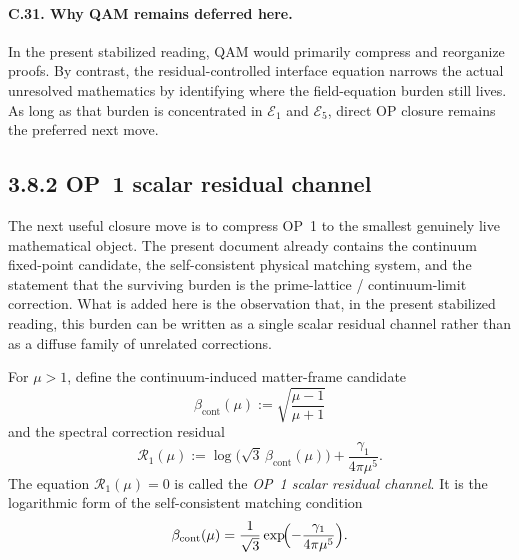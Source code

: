\paragraph{C.31. Why QAM remains deferred here.}
In the present stabilized reading, QAM would primarily compress and reorganize proofs. By contrast, the residual-controlled interface equation narrows the actual unresolved mathematics by identifying where the field-equation burden still lives. As long as that burden is concentrated in \(\mathcal E_{1}\) and \(\mathcal E_{5}\), direct OP closure remains the preferred next move.


\subsection*{3.8.2 OP~1 scalar residual channel}
The next useful closure move is to compress OP~1 to the smallest genuinely live mathematical object. The present document already contains the continuum fixed-point candidate, the self-consistent physical matching system, and the statement that the surviving burden is the prime-lattice / continuum-limit correction. What is added here is the observation that, in the present stabilized reading, this burden can be written as a single scalar residual channel rather than as a diffuse family of unrelated corrections.

\begin{definition}
\label{def:mainline-3820}
For \(\mu>1\), define the continuum-induced matter-frame candidate
\[
  \beta_{\mathrm{cont}}(\mu):=\sqrt{\frac{\mu-1}{\mu+1}}
\]
and the spectral correction residual
\[
  \mathcal R_{1}(\mu)
  :=
  \log\!\bigl(\sqrt{3}\,\beta_{\mathrm{cont}}(\mu)\bigr)
  +
  \frac{\gamma_1}{4\pi\mu^5}.
\]
The equation \(\mathcal R_{1}(\mu)=0\) is called the \emph{OP~1 scalar residual channel}. It is the logarithmic form of the self-consistent matching condition
\[
  \beta_{\mathrm{cont}}(\mu)
  =
  \frac{1}{\sqrt{3}}\exp\!\Bigl(-\frac{\gamma_1}{4\pi\mu^5}\Bigr).
\]
\end{definition}

